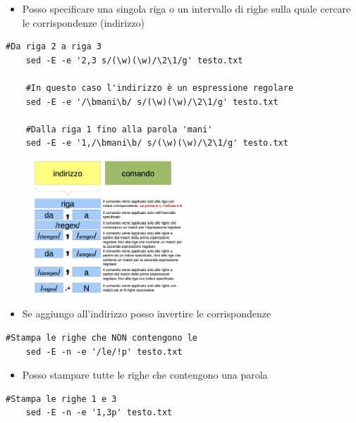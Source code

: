 \documentclass[../main.tex]{subfiles}
\begin{document}
\pagebreak
\begin{itemize}
    \item Posso specificare una singola riga o un intervallo di righe sulla quale cercare le corrispondenze (indirizzo)
\end{itemize}
\begin{lstlisting}[style=bash]
    #Da riga 2 a riga 3
    sed -E -e '2,3 s/(\w)(\w)/\2\1/g' testo.txt

    #In questo caso l'indirizzo è un espressione regolare
    sed -E -e '/\bmani\b/ s/(\w)(\w)/\2\1/g' testo.txt

    #Dalla riga 1 fino alla parola 'mani'
    sed -E -e '1,/\bmani\b/ s/(\w)(\w)/\2\1/g' testo.txt
\end{lstlisting}
\begin{figure}[h]
    \centering
    \includegraphics[width=0.5\textwidth]{../images/sep.png}
\end{figure}


\vspace{1cm}
\begin{itemize}
    \item Se aggiungo \code{!} all'indirizzo posso invertire le corrispondenze
\end{itemize}
\begin{lstlisting}[style=bash]
    #Stampa le righe che NON contengono le
    sed -E -n -e '/le/!p' testo.txt
\end{lstlisting}

\vspace{0.5cm}
\begin{itemize}
    \item Posso stampare tutte le righe che contengono una parola
\end{itemize}
\begin{lstlisting}[style=bash]
    #Stampa le righe 1 e 3
    sed -E -n -e '1,3p' testo.txt
\end{lstlisting}
\end{document}
